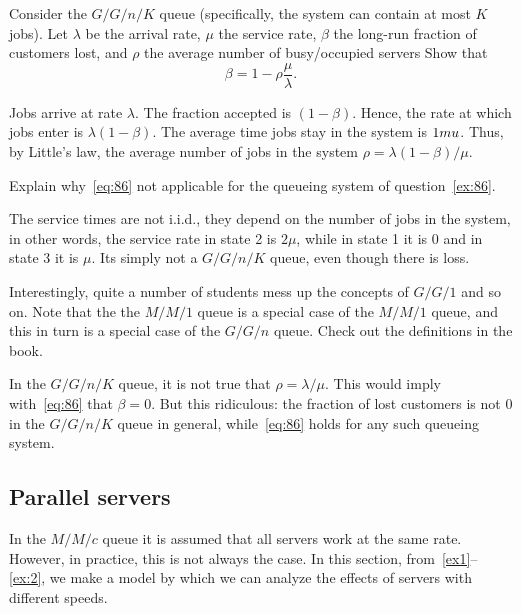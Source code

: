 \begin{exercise}[201807]
 Consider the $G/G/n/K$ queue (specifically, the system can contain at most $K$ jobs).
 Let $\lambda$ be the arrival rate, $\mu$ the service rate, $\beta$ the long-run fraction of customers lost, and $\rho$ the average number of busy/occupied servers Show that
 \begin{equation}\label{eq:86}
 \beta = 1 - \rho\frac{\mu}{\lambda}.
 \end{equation}
\begin{solution}
 Jobs arrive at rate $\lambda$.
 The fraction accepted is $(1-\beta)$.
 Hence, the rate at which jobs enter is $\lambda(1-\beta)$. The average time jobs stay in the system is $1\\mu$. Thus, by Little's law, the average number of jobs in the system $\rho=\lambda(1-\beta)/\mu$. 
\end{solution}
\end{exercise}


\begin{exercise}[201807]
 Explain why~\cref{eq:86} not applicable for the queueing system of question~\cref{ex:86}.
\begin{solution}
 The service times are not i.i.d., they depend on the number of jobs in the system, in other words, the service rate in state 2 is $2\mu$, while in state 1 it is 0 and in state 3 it is $\mu$. Its simply not a $G/G/n/K$ queue, even though there is loss. 


Interestingly, quite a number of students mess up the concepts of $G/G/1$ and so on. Note that the the $M/M/1$ queue is a special case of the $M/M/1$ queue, and this in turn is a special case of the $G/G/n$ queue. Check out the definitions in the book.

In the $G/G/n/K$ queue, it is not true that $\rho=\lambda/\mu$. This would imply with~\cref{eq:86} that $\beta=0$. But this ridiculous: the fraction of lost customers is not 0 in the $G/G/n/K$ queue in general, while~\cref{eq:86} holds for any such queueing system. 
\end{solution}
\end{exercise}

\subsection{Parallel servers}
\label{sec:parallel-servers}

In the $M/M/c$ queue it is assumed that all servers work at the same rate.
However, in practice, this is not always the case.
In this section, from~\cref{ex1}--\cref{ex:2}, we make a model by which we can analyze the effects of servers with different speeds.

